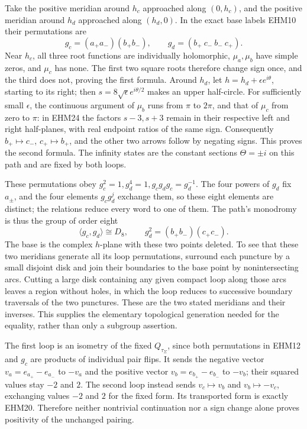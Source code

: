 \documentclass[
  10pt,
  a4paper,
]{article}
\begin{document}
Take the positive meridian around \(h_c\) approached along \((0,h_c)\),
and the positive meridian around \(h_d\) approached along \((h_d,0)\).
In the exact base labels EHM10 their permutations are \[
g_c=(a_+a_-)(b_+b_-),\qquad
g_d=(b_+\ c_-\ b_-\ c_+).
\tag{EHM25}
\] Near \(h_c\), all three root functions are individually holomorphic,
\(\mu_a,\mu_b\) have simple zeros, and \(\mu_c\) has none. The first two
square roots therefore change sign once, and the third does not, proving
the first formula. Around \(h_d\), let \(h=h_d+\epsilon e^{i\theta}\),
starting to its right; then \(s=8\sqrt\epsilon e^{i\theta/2}\) makes an
upper half-circle. For sufficiently small \(\epsilon\), the continuous
argument of \(\mu_b\) runs from \(\pi\) to \(2\pi\), and that of
\(\mu_c\) from zero to \(\pi\): in EHM24 the factors \(s-3,s+3\) remain
in their respective left and right half-planes, with real endpoint
ratios of the same sign. Consequently \(b_+\mapsto c_-\),
\(c_+\mapsto b_+\), and the other two arrows follow by negating signs.
This proves the second formula. The infinity states are the constant
sections \(\Theta=\pm i\) on this path and are fixed by both loops.

These permutations obey \(g_c^2=1,g_d^4=1,g_cg_dg_c=g_d^{-1}\). The four
powers of \(g_d\) fix \(a_\pm\), and the four elements \(g_cg_d^j\)
exchange them, so these eight elements are distinct; the relations
reduce every word to one of them. The path's monodromy is thus the group
of order eight \[
\langle g_c,g_d\rangle\cong D_8,
\qquad g_d^2=(b_+b_-)(c_+c_-).
\tag{EHM26}
\] The base is the complex \(h\)-plane with these two points deleted. To
see that these two meridians generate all its loop permutations,
surround each puncture by a small disjoint disk and join their
boundaries to the base point by nonintersecting arcs. Cutting a large
disk containing any given compact loop along those arcs leaves a region
without holes, in which the loop reduces to successive boundary
traversals of the two punctures. These are the two stated meridians and
their inverses. This supplies the elementary topological generation
needed for the equality, rather than only a subgroup assertion.

The first loop is an isometry of the fixed \(Q_{\tau_\Sigma}\), since
both permutations in EHM12 and \(g_c\) are products of individual pair
flips. It sends the negative vector \(v_a=e_{a_+}-e_{a_-}\) to \(-v_a\)
and the positive vector \(v_b=e_{b_+}-e_{b_-}\) to \(-v_b\); their
squared values stay \(-2\) and \(2\). The second loop instead sends
\(v_c\mapsto v_b\) and \(v_b\mapsto-v_c\), exchanging values \(-2\) and
\(2\) for the fixed form. Its transported form is exactly EHM20.
Therefore neither nontrivial continuation nor a sign change alone proves
positivity of the unchanged pairing.
\end{document}
